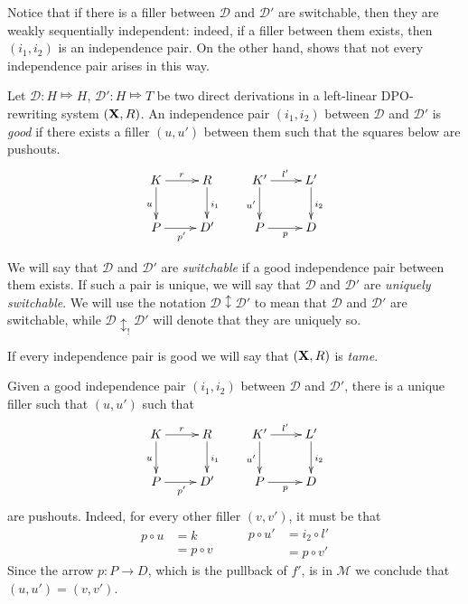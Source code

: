 \documentclass[a4paper,UKenglish,cleveref,pdftex, thm-restate,numberwithinsect]{lipics}
\def\R{\mathsf{R}}
\def\X{\textbf {\textup{X}}}
\renewcommand{\P}{\textbf {\textup{P}}}
\newcommand{\dder}[1]{\mathscr{#1}}
\begin{document}
Notice that if there is a filler between  $\dder{D}$ and $\dder{D}'$ are switchable, then they are weakly sequentially independent: indeed, if a filler between them exists, then $(i_1, i_2)$ is an independence pair. On the other hand,  shows that not every independence pair arises in this way.

\begin{definition}
  \label{de:good-switchable}
  Let $\dder{D}\colon H\Mapsto H$, $\dder{D}'\colon H\Mapsto T$ be two
  direct derivations in a left-linear DPO-rewriting system $(\X,
  \R)$. An independence pair $(i_1, i_2)$ between $\dder{D}$ and
  $\dder{D}'$ is \emph{good} if there exists a filler $(u,u')$ between
  them such that the squares below are
  pushouts.\[\xymatrix{K \ar[r]^{r} \ar[d]_{u}& R \ar[d]^{i_1} &K'
      \ar[r]^{l'} \ar[d]_{u'}& L'\ar[d]^{i_2} \\P \ar[r]_{p'}& D' & P
      \ar[r]_{p} & D}\]
	
We will say that $\dder{D}$ and $\dder{D}'$ are \emph{switchable} if a good independence pair between them exists. If such a pair is unique, we will say that $\dder{D}$ and $\dder{D}'$ are \emph{uniquely switchable}. We will use the notation $\dder{D}\updownarrow \dder{D'}$ to mean that $\dder{D}$ and $\dder{D}'$ are switchable, while $\dder{D}\updownarrow_! \dder{D'}$ will denote that they are uniquely so.


If every independence pair is good we will say that $(\X, \R)$ is \emph{tame}.
\end{definition}

\begin{remark}\label{rem:unic} Given a good independence pair $(i_1, i_2)$ between $\dder{D}$ and $\dder{D}'$, there is a unique filler  such that $(u,u')$ such that 
	\[\xymatrix{K \ar[r]^{r} \ar[d]_{u}& R \ar[d]^{i_1} &K' \ar[r]^{l'} \ar[d]_{u'}& L'\ar[d]^{i_2} \\P \ar[r]_{p'}& D' & P \ar[r]_{p} & D}\]
	are pushouts. Indeed, for every other filler $(v,v')$, it must be that
	\[\begin{split}
		p\circ u &=k \\&= p\circ v
	\end{split}\qquad \begin{split}
	p\circ u' &= i_2\circ l' \\&= p\circ v'
	\end{split}\]
	Since the arrow $p\colon P\to D$, which is the pullback of $f'$, is in $\mathcal{M}$ we conclude that $(u,u')=(v,v')$.
\end{remark}
\end{document}
